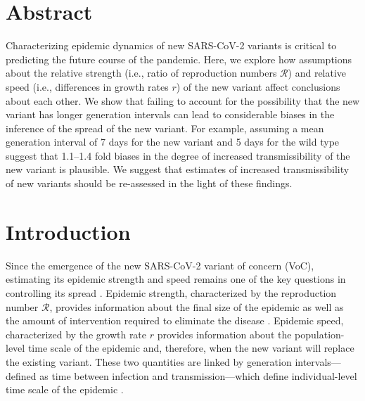 \documentclass[12pt]{article}
\date{\today}
\newcommand{\RR}{\ensuremath{{\mathcal R}}\xspace}
\begin{document}
\begin{flushleft}{
	\Large
	\textbf{}
}
\end{flushleft}

\section*{Abstract}

Characterizing epidemic dynamics of new SARS-CoV-2 variants is critical to predicting the future course of the pandemic.
Here, we explore how assumptions about the relative strength (i.e., ratio of reproduction numbers $\RR$) and relative speed (i.e., differences in growth rates $r$) of the new variant affect conclusions about each other.
We show that failing to account for the possibility that the new variant has longer generation intervals can lead to considerable biases in the inference of the spread of the new variant.
For example, assuming a mean generation interval of 7 days for the new variant and 5 days for the wild type suggest that 1.1--1.4 fold biases in the degree of increased transmissibility of the new variant is plausible.
We suggest that estimates of increased transmissibility of new variants should be re-assessed in the light of these findings.

\section{Introduction}

Since the emergence of the new SARS-CoV-2 variant of concern (VoC), estimating its epidemic strength and speed remains one of the key questions in controlling its spread \citep{switzerland2021variant, davies2021estimated, di2021impact, leung2021early, volz2021transmission,zhao2021}.
Epidemic strength, characterized by the reproduction number $\RR$, provides information about the final size of the epidemic as well as the amount of intervention required to eliminate the disease \citep{anderson1991infectious}.
Epidemic speed, characterized by the growth rate $r$ provides information about the population-level time scale of the epidemic and, therefore, when the new variant will replace the existing variant.
These two quantities are linked by generation intervals---defined as time between infection and transmission---which define individual-level time scale of the epidemic \citep{roberts2007model,svensson2007note,wallinga2007generation}.
\end{document}
